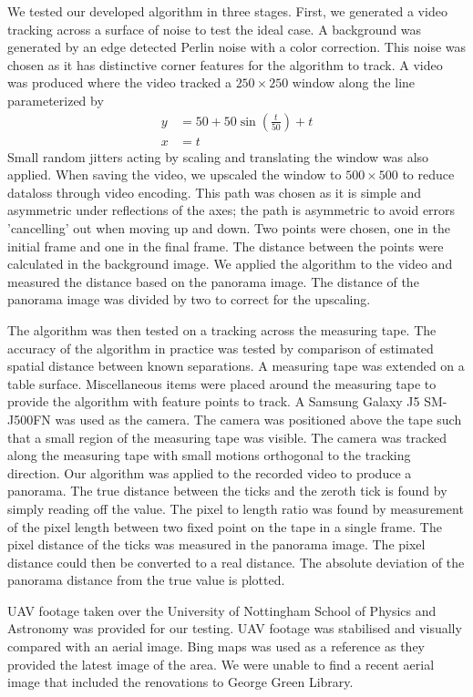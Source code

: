 We tested our developed algorithm in three stages.
First, we generated a video tracking across a surface of noise to test the ideal case.
A background was generated by an edge detected Perlin noise \cite{Perlin1985} with a color correction.
This noise was chosen as it has distinctive corner features for the algorithm to track.
A video was produced where the video tracked a $250\times250$ window along the line parameterized by
\begin{align}
  y & = 50 + 50\sin{\left(\frac{t}{50}\right)} + t \\
	x & = t 
\end{align}
Small random jitters acting by scaling and translating the window was also applied.
When saving the video, we upscaled the window to $500\times500$ to reduce dataloss through video encoding.
This path was chosen as it is simple and asymmetric under reflections of the axes;
the path is asymmetric to avoid errors 'cancelling' out when moving up and down.
Two points were chosen, one in the initial frame and one in the final frame.
The distance between the points were calculated in the background image.
We applied the algorithm to the video and measured the distance based on the panorama image. 
The distance of the panorama image was divided by two to correct for the upscaling.

The algorithm was then tested on a tracking across the measuring tape.
The accuracy of the algorithm in practice was tested by comparison of estimated spatial distance between known separations.
A measuring tape was extended on a table surface.
Miscellaneous items were placed around the measuring tape to provide the algorithm with feature points to track.
A Samsung Galaxy J5 SM-J500FN was used as the camera.
The camera was positioned above the tape such that a small region of the measuring tape was visible.
The camera was tracked along the measuring tape with small motions orthogonal to the tracking direction.
Our algorithm was applied to the recorded video to produce a panorama.
The true distance between the ticks and the zeroth tick is found by simply reading off the value.
The pixel to length ratio was found by measurement of the pixel length between two fixed point on the tape in a single frame.
The pixel distance of the ticks was measured in the panorama image.
The pixel distance could then be converted to a real distance.
The absolute deviation of the panorama distance from the true value is plotted.

UAV footage taken over the University of Nottingham School of Physics and Astronomy was provided for our testing.
UAV footage was stabilised and visually compared with an aerial image.
Bing maps was used as a reference as they provided the latest image of the area.
We were unable to find a recent aerial image that included the renovations to George Green Library.
